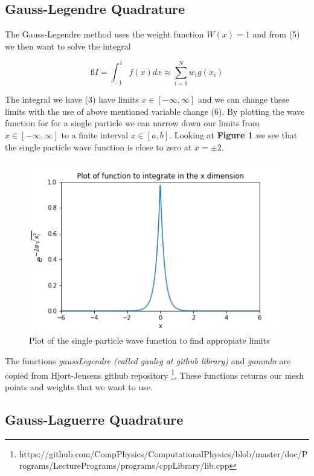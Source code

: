 \documentclass[twoside,twocolumn]{article}
\begin{document}
\subsection{Gauss-Legendre Quadrature}


The Gauss-Legendre method uses the weight function $W(x) = 1$ and from (5) we then want to solve the integral 

\begin{equation}ß
   I = \int_{-1}^{1}f(x)dx \approx\sum_{i=1}^{N} w_ig(x_i)
\end{equation}

The integral we have (3) have limits $x\in[-\infty,\infty]$ and we can change these limits with the use of above mentioned variable change (6). By plotting the wave function for for a single particle we can narrow down our limits from $x\in[-\infty,\infty]$ to a finite interval $x\in[a,b]$. Looking at \textbf{Figure 1} we see that the single particle wave function is close to zero at $x = \pm2$. 
\begin{figure}[h]
\center
\includegraphics[scale=0.55]{figure1.png}
\caption{Plot of the single particle wave function to find appropiate limits}
\end{figure}

The functions \textit{gaussLegendre (called gauleg at github library)} and \textit{gammln} are copied from Hjort-Jensens github repository \footnote{https://github.com/CompPhysics/ComputationalPhysics/blob/master/doc/Programs/LecturePrograms/programs/cppLibrary/lib.cpp}. These functions returns our mesh points and weights that we want to use.


\subsection{Gauss-Laguerre Quadrature}
\end{document}
